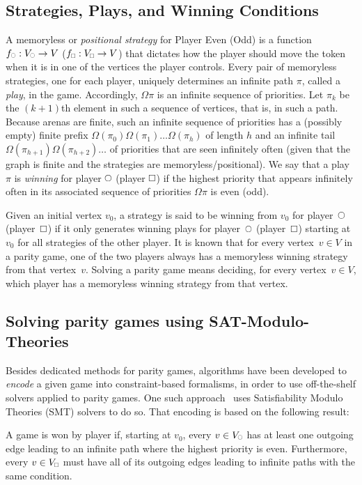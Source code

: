 \documentclass[letterpaper]{article} %
\begin{document}
\subsection*{Strategies, Plays, and Winning Conditions}
A memoryless or {\em positional strategy} for Player Even (Odd) is a function $f_{\subeven} : V_{\subeven} \to V$ ($f_{\subodd} : V_{\subodd} \to V$) that dictates how the player should move the token when it is in one of the vertices the player controls. Every pair of memoryless strategies, one for each player, uniquely determines an infinite path $\pi$, called a {\em play}, in the game. Accordingly, $\Omega \pi$ is an infinite sequence of priorities. Let $\pi_k$ be the $(k+1)$th element in such a sequence of vertices, that is, in such a path. Because arenas are finite, such an infinite sequence of priorities has a (possibly empty) finite prefix $\Omega(\pi_0) \Omega(\pi_1) \ldots \Omega(\pi_h)$ of length $h$ and an infinite tail $\Omega(\pi_{h+1}) \Omega(\pi_{h+2}) \ldots$ of priorities that are seen infinitely often (given that the graph is finite and the strategies are memoryless/positional). We say that a play~$\pi$ is {\em winning} for player $\even$ (player $\odd$) if the highest priority that appears infinitely often in its associated sequence of priorities $\Omega \pi$ is even (odd). 

Given an initial vertex $v_0$, a strategy is said to be winning from $v_0$ for player~$\even$ (player~$\odd$) if it only generates winning plays for player~$\even$ (player~$\odd$) starting at $v_0$ for all strategies of the other player. It is known that for every vertex~$v\in V$ in a parity game, one of the two players always has a memoryless winning strategy from that vertex~$v$. Solving a parity game means deciding, for every vertex~$v\in V$, which player has a memoryless winning strategy from that vertex.

\subsection{Solving parity games using SAT-Modulo-Theories}

Besides dedicated methods for parity games, algorithms have been developed to \textit{encode} a given game into constraint-based formalisms, in order to use off-the-shelf solvers applied to parity games. One such approach~\cite{Heljanko:2012} uses Satisfiability Modulo Theories (SMT) solvers to do so. 
That encoding is based on the following result:

\begin{definition}\label{def:smt-condition}
    A game is won by player \even if, starting at $v_0$, every $v \in V_{\subeven}$ has at least one outgoing edge leading to an infinite path where the highest priority is even. Furthermore, every $v \in V_{\subodd}$ must have all of its outgoing edges leading to infinite paths with the same condition.
\end{definition}
\end{document}
